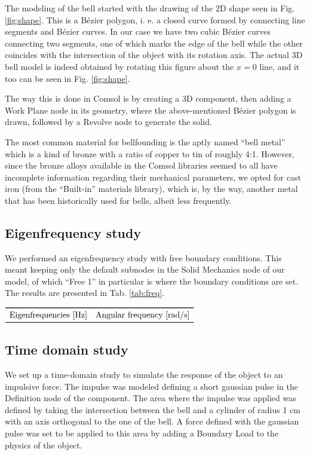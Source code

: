 \documentclass[a4paper]{article}
\begin{document}
The modeling of the bell started with the drawing of the 2D shape seen in Fig. \ref{fig:shape}. This is a Bézier polygon, i. e. a closed curve formed by connecting line segments and Bézier curves. In our case we have two cubic Bézier curves connecting two segments, one of which marks the edge of the bell while the other coincides with the intersection of the object with its rotation axis. The actual 3D bell model is indeed obtained by rotating this figure about the $x=0$ line, and it too can be seen in Fig. \ref{fig:shape}.

The way this is done in Comsol is by creating a 3D component, then adding a Work Plane node in its geometry, where the above-mentioned Bézier polygon is drawn, followed by a Revolve node to generate the solid.

The most common material for bellfounding is the aptly named ``bell metal'' which is a kind of bronze with a ratio of copper to tin of roughly 4:1. However, since the bronze alloys available in the Comsol libraries seemed to all have incomplete information regarding their mechanical parameters, we opted for cast iron (from the ``Built-in'' materials library), which is, by the way, another metal that has been historically used for bells, albeit less frequently.

\subsection{Eigenfrequency study}

We performed an eigenfrequency study with free boundary conditions. This meant keeping only the default subnodes in the Solid Mechanics node of our model, of which ``Free 1'' in particular is where the boundary conditions are set. The results are presented in Tab. \ref{tab:freq}.

\begin{table}[h]
	\centering
	$\begin{array}{ll}
		\toprule
		\text{Eigenfrequencies [Hz]} & \text{Angular frequency [rad/s]}\\
		
		\bottomrule
	\end{array}$
	\caption{}
	\label{tab:freq}
\end{table}


\subsection{Time domain study}
We set up a time-domain study to simulate the response of the object to an impulsive force. The impulse was modeled defining a short gaussian pulse in the Definition node of the component. The area where the impulse was applied was defined by taking the intersection between the bell and a cylinder of radius 1 cm with an axis orthogonal to the one of the bell. A force defined with the gaussian pulse was set to be applied to this area by adding a Boundary Load to the physics of the object.
\end{document}
